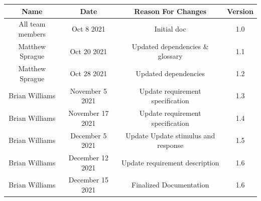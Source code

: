 \documentclass{scrreprt}
\begin{document}
\begin{center}
    \begin{tabular}{c c c c}
        \midrule
        Name             & Date       & Reason For Changes & Version \\
        \midrule
        All team members & Oct 8 2021 & Initial doc        & 1.0     \\
        \midrule
        Matthew Sprague
                         & Oct 20 2021
                         & Updated dependencies \& glossary
                         & 1.1                                       \\
        Matthew Sprague
                         & Oct 28 2021
                         & Updated dependencies
                         & 1.2                                       \\
        \midrule
        
        Brian Williams
                         & November 5 2021
                         & Update requirement specification
                         & 1.3                                       \\
        
        Brian Williams
                         & November 17 2021
                         & Update requirement specification
                         & 1.4                                       \\
        
        Brian Williams
                         & December 5 2021
                         & Update Update stimulus and response
                         & 1.5                                       \\
        
        Brian Williams
                         & December 12 2021
                         & Update requirement description
                         & 1.6        
                    
                    \\
                    
                     Brian Williams
                         & December 15 2021
                         & Finalized Documentation
                         & 1.6        
                    
                    \\
        \midrule
    \end{tabular}
\end{center}
\end{document}
